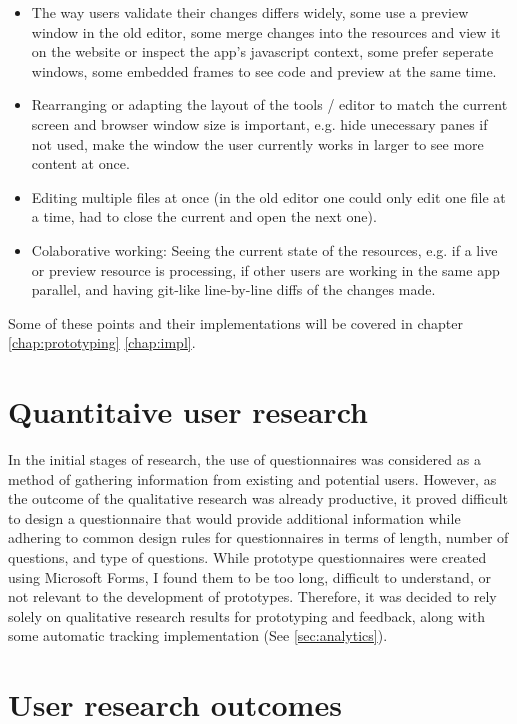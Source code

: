 \begin{itemize}
  \item The way users validate their changes differs widely, some use a preview window in the old editor, some merge changes into the resources and view it on the website or inspect the app's javascript context, some prefer seperate windows, some embedded frames to see code and preview at the same time.
  \item Rearranging or adapting the layout of the tools / editor to match the current screen and browser window size is important, e.g. hide unecessary panes if not used, make the window the user currently works in larger to see more content at once.
  \item Editing multiple files at once (in the old editor one could only edit one file at a time, had to close the current and open the next one).
  \item Colaborative working: Seeing the current state of the resources, e.g. if a live or preview resource is processing, if other users are working in the same app parallel, and having git-like line-by-line diffs of the changes made.
\end{itemize}

Some of these points and their implementations will be covered in chapter \ref*{chap:prototyping} \ref*{chap:impl}.

\section{Quantitaive user research}

In the initial stages of research, the use of questionnaires was considered as a method of gathering information from existing and potential users.
However, as the outcome of the qualitative research was already productive, it proved difficult to design a questionnaire that would provide additional information while adhering to common design rules for questionnaires in terms of length, number of questions, and type of questions.
While prototype questionnaires were created using Microsoft Forms, I found them to be too long, difficult to understand, or not relevant to the development of prototypes.
Therefore, it was decided to rely solely on qualitative research results for prototyping and feedback, along with some automatic tracking implementation (See \ref{sec:analytics}).
\\
\section{User research outcomes}

